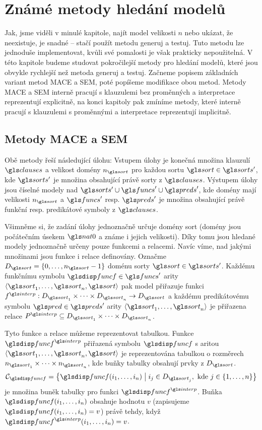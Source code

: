 \chapter{Známé metody hledání modelů}

Jak, jsme viděli v minulé kapitole, najít model
velikosti $n$ nebo ukázat, že neexistuje, je snadné --
stačí použít metodu generuj a testuj.
Tuto metodu lze jednoduše implementovat,
kvůli své pomalosti je však prakticky nepoužitelná.
V této kapitole budeme studovat pokročilejší metody
pro hledání modelů, které jsou obvykle rychlejší
než metoda generuj a testuj.
Začneme popisem základních variant metod MACE a SEM,
poté popíšeme modifikace obou metod.
Metody MACE a SEM interně pracují s klauzulemi bez proměnných
a interpretace reprezentují explicitně,
na konci kapitoly pak zmíníme metody, které interně
pracují s klauzulemi s proměnnými a interpretace reprezentují
implicitně.

\section{Metody MACE a SEM}

Obě metody řeší následující úlohu:
Vstupem úlohy je konečná množina
klauzulí $\clauses$ a velikost domény $n_\sort$
pro každou sortu $\sort \in \sorts'$, kde $\sorts'$ je množina
obsahující právě sorty z $\clauses$. Výstupem úlohy jsou číselné modely
nad $\sorts' \cup \funcs' \cup \preds'$, kde domény mají velikosti
$n_\sort$ a $\funcs'$ resp. $\preds'$ je množina obsahující právě funkční
resp. predikátové symboly z $\clauses$.

Všimněme si, že zadání úlohy jednoznačně určuje domény sort
(domény jsou počátečním úsekem $\nat0$ a známe i jejich velikosti).
Díky tomu jsou hledané modely jednoznačně určeny pouze funkcemi a relacemi.
Navíc víme, nad jakými množinami jsou funkce i relace definovány.
Označme $D_\sort = \{ 0 \comdots n_\sort - 1 \}$ doménu
sorty $\sort \in \sorts'$.
Každému funkčnímu symbolu $\func \in \funcs'$ arity
$\langle \sort_1 \comdots \sort_n, \sort \rangle$ pak model přiřazuje funkci
$f^\interp : D_{\sort_1} \timdots D_{\sort_n} \to D_\sort$
a každému predikátovému symbolu $\pred \in \preds'$ arity
$\langle \sort_1 \comdots \sort_n \rangle$
je přiřazena relace $P^\interp \subseteq D_{\sort_1} \timdots D_{\sort_n}$.

\newcommand\cells{\ensuremath{\mathcal{C}}}

Tyto funkce a relace můžeme reprezentovat tabulkou.
Funkce $\func^\interp$ přiřazená symbolu $\func$
s aritou $\langle \sort_1 \comdots \sort_n, \sort \rangle$
je reprezentována tabulkou o rozměrech $n_{\sort_1} \timdots n_{\sort_n}$,
kde buňky tabulky obsahují prvky z $D_\sort$.
\[
\cells_\func = \bigl\{ \func(i_1 \comdots i_n) \bigm| i_j \in D_{\sort_j},
  \text{ kde } j \in \{ 1 \comdots n  \}  \bigr\}
\]
je množina buněk tabulky pro funkci $\func^\interp$.
Buňka $\func(i_1 \comdots i_n)$ obsahuje hodnotu $v$ (zapisujeme
$\func(i_1 \comdots i_n) = v$) právě tehdy,
když $\func^\interp(i_1 \comdots i_n) = v$.

